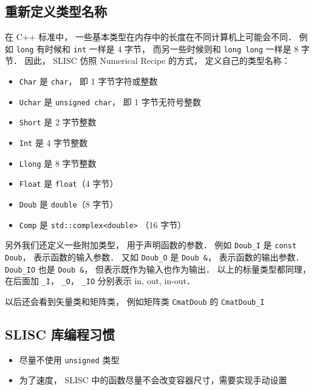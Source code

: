 \subsection{重新定义类型名称}
在 C++ 标准中， 一些基本类型在内存中的长度在不同计算机上可能会不同． 例如 \verb|long| 有时候和 \verb|int| 一样是 4 字节， 而另一些时候则和 \verb|long long| 一样是 8 字节． 因此， SLISC 仿照 Numerical Recipe 的方式， 定义自己的类型名称：
\begin{itemize}
\item \verb|Char| 是 \verb|char|， 即 1 字节字符或整数
\item \verb|Uchar| 是 \verb|unsigned char|， 即 1 字节无符号整数
\item \verb|Short| 是 2 字节整数
\item \verb|Int| 是 4 字节整数
\item \verb|Llong| 是 8 字节整数
\item \verb|Float| 是 \verb|float|（4 字节）
\item \verb|Doub| 是 \verb|double|（8 字节）
\item \verb|Comp| 是 \verb|std::complex<double>| （16 字节）
\end{itemize}
另外我们还定义一些附加类型， 用于声明函数的参数． 例如 \verb|Doub_I| 是 \verb|const Doub|， 表示函数的输入参数． 又如 \verb|Doub_O| 是 \verb|Doub &|， 表示函数的输出参数． \verb|Doub_IO| 也是 \verb|Doub &|， 但表示既作为输入也作为输出． 以上的标量类型都同理， 在后面加 \verb|_I|， \verb|_O|， \verb|_IO| 分别表示 in, out, in-out．

以后还会看到矢量类和矩阵类， 例如矩阵类 \verb|CmatDoub| 的 \verb|CmatDoub_I|

\subsection{SLISC 库编程习惯}
\begin{itemize}
\item 尽量不使用 \verb|unsigned| 类型
\item 为了速度， SLISC 中的函数尽量不会改变容器尺寸，需要实现手动设置
\end{itemize}

